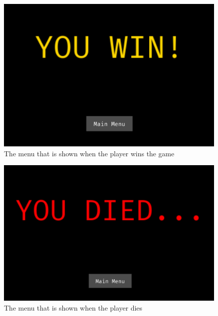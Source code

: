 \documentclass[../Main.tex]{subfiles}
\begin{document}
            \begin{figure}[hbt!]
                \centerline{\includegraphics[scale=0.4]{img/Testing/Objective/WinMenu.png}}
                \caption{The menu that is shown when the player wins the game}
                \label{fig:WinMenu}
            \end{figure}
            \clearpage
            \begin{figure}[hbt!]
                \centerline{\includegraphics[scale=0.4]{img/Testing/Objective/DeathMenu.png}}
                \caption{The menu that is shown when the player dies}
                \label{fig:DeathMenu}
            \end{figure}
\end{document}
